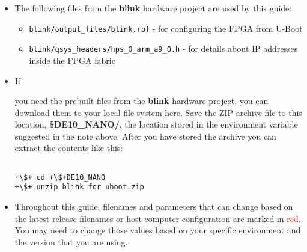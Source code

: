 \begin{flushleft}
\begin{itemize}
\begin{verbatim}

+\$+ export DE10_NANO=+\textasciitilde+/de10-nano

\end{verbatim}

\item The following files from the \textbf{blink} hardware project are used by this guide:

\begin{itemize}

\item \texttt{blink/output\_files/blink.rbf} - for configuring the FPGA from U-Boot

\item \texttt{blink/qsys\_headers/hps\_0\_arm\_a9\_0.h} - for details about IP addresses inside the FPGA fabric

\end{itemize}

\item \hypertarget{blinkArchive}{If} you need the prebuilt files from the \textbf{blink} hardware project, you can download them to your local file system \href{\TheReleasesURL/blink_for_uboot.zip}{\underline{here}}.  Save the ZIP archive file to this location, \textbf{\$DE10\_NANO/}, the location stored in the environment variable suggested in the note above.  After you have stored the archive you can extract the contents like this:


\begin{verbatim}

+\$+ cd +\$+DE10_NANO
+\$+ unzip blink_for_uboot.zip

\end{verbatim}

\item Throughout this guide, filenames and parameters that can change based on the latest release filenames or host computer configuration are marked in \textcolor{red}{red}.  You may need to change those values based on your specific environment and the version that you are using.

\end{itemize}

\end{flushleft}

